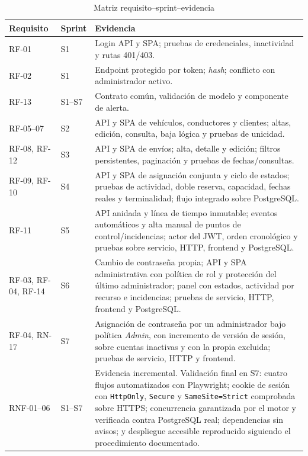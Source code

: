 \begin{longtable}{p{1.5cm}p{1.2cm}p{7.8cm}}
\caption{Matriz requisito--sprint--evidencia}\label{tab:trace}\\
\hline Requisito & Sprint & Evidencia \\ \hline
RF-01 & S1 & Login API y SPA; pruebas de credenciales, inactividad y rutas 401/403. \\
RF-02 & S1 & Endpoint protegido por token; \emph{hash}; conflicto con administrador activo. \\
RF-13 & S1--S7 & Contrato común, validación de modelo y componente de alerta. \\
RF-05--07 & S2 & API y SPA de vehículos, conductores y clientes; altas, edición, consulta, baja lógica y pruebas de unicidad. \\
RF-08, RF-12 & S3 & API y SPA de envíos; alta, detalle y edición; filtros persistentes, paginación y pruebas de fechas/consultas. \\
RF-09, RF-10 & S4 & API y SPA de asignación conjunta y ciclo de estados; pruebas de actividad, doble reserva, capacidad, fechas reales y terminalidad; flujo integrado sobre PostgreSQL. \\
RF-11 & S5 & API anidada y línea de tiempo inmutable; eventos automáticos y alta manual de puntos de control/incidencias; actor del JWT, orden cronológico y pruebas sobre servicio, HTTP, frontend y PostgreSQL. \\
RF-03, RF-04, RF-14 & S6 & Cambio de contraseña propia; API y SPA administrativa con política de rol y protección del último administrador; panel con estados, actividad por recurso e incidencias; pruebas de servicio, HTTP, frontend y PostgreSQL. \\
RF-04, RN-17 & S7 & Asignación de contraseña por un administrador bajo política \emph{Admin}, con incremento de versión de sesión, sobre cuentas inactivas y con la propia excluida; pruebas de servicio, HTTP y frontend. \\
RNF-01--06 & S1--S7 & Evidencia incremental. Validación final en S7: cuatro flujos automatizados con Playwright; cookie de sesión con \texttt{HttpOnly}, \texttt{Secure} y \texttt{SameSite=Strict} comprobada sobre HTTPS; concurrencia garantizada por el motor y verificada contra PostgreSQL real; dependencias sin avisos; y despliegue accesible reproducido siguiendo el procedimiento documentado. \\
\hline
\end{longtable}
